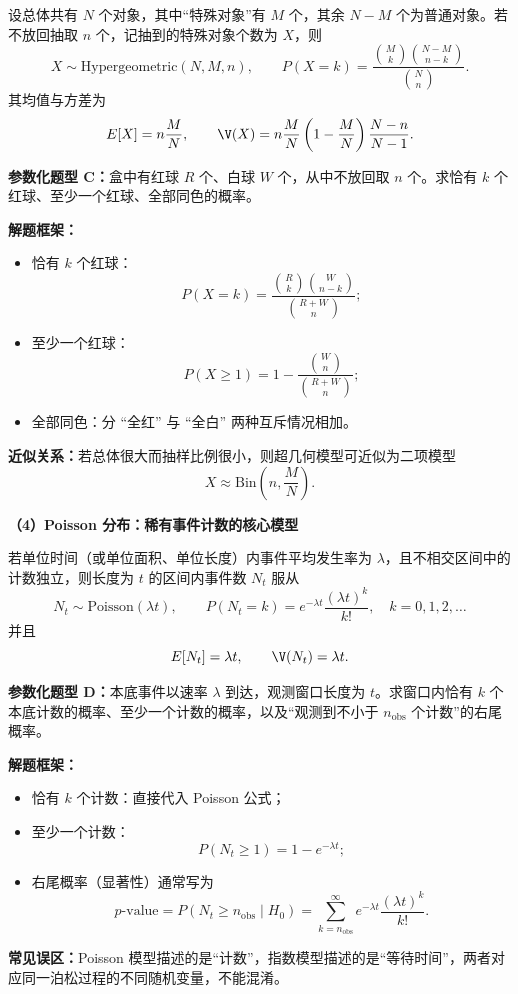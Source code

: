 设总体共有 $N$ 个对象，其中“特殊对象”有 $M$ 个，其余 $N-M$ 个为普通对象。若不放回抽取 $n$ 个，记抽到的特殊对象个数为 $X$，则
\[
X\sim \mathrm{Hypergeometric}(N,M,n),\qquad
P(X=k)=\frac{\binom{M}{k}\binom{N-M}{n-k}}{\binom{N}{n}}.
\]
其均值与方差为
\[
E[X]=n\frac{M}{N},\qquad
\V(X)=n\frac{M}{N}\left(1-\frac{M}{N}\right)\frac{N-n}{N-1}.
\]

\textbf{参数化题型 C：}盒中有红球 $R$ 个、白球 $W$ 个，从中不放回取 $n$ 个。求恰有 $k$ 个红球、至少一个红球、全部同色的概率。

\textbf{解题框架：}
\begin{itemize}[leftmargin=2em,itemsep=0.12em,topsep=0.12em]
  \item 恰有 $k$ 个红球：
  \[
  P(X=k)=\frac{\binom{R}{k}\binom{W}{n-k}}{\binom{R+W}{n}};
  \]
  \item 至少一个红球：
  \[
  P(X\ge 1)=1-\frac{\binom{W}{n}}{\binom{R+W}{n}};
  \]
  \item 全部同色：分 ``全红'' 与 ``全白'' 两种互斥情况相加。
\end{itemize}

\textbf{近似关系：}若总体很大而抽样比例很小，则超几何模型可近似为二项模型
\[
X\approx \mathrm{Bin}\left(n,\frac{M}{N}\right).
\]

\textbf{（4）Poisson 分布：稀有事件计数的核心模型}

若单位时间（或单位面积、单位长度）内事件平均发生率为 $\lambda$，且不相交区间中的计数独立，则长度为 $t$ 的区间内事件数 $N_t$ 服从
\[
N_t\sim \mathrm{Poisson}(\lambda t),\qquad
P(N_t=k)=e^{-\lambda t}\frac{(\lambda t)^k}{k!},\quad k=0,1,2,\dots
\]
并且
\[
E[N_t]=\lambda t,\qquad \V(N_t)=\lambda t.
\]

\textbf{参数化题型 D：}本底事件以速率 $\lambda$ 到达，观测窗口长度为 $t$。求窗口内恰有 $k$ 个本底计数的概率、至少一个计数的概率，以及“观测到不小于 $n_\mathrm{obs}$ 个计数”的右尾概率。

\textbf{解题框架：}
\begin{itemize}[leftmargin=2em,itemsep=0.12em,topsep=0.12em]
  \item 恰有 $k$ 个计数：直接代入 Poisson 公式；
  \item 至少一个计数：
  \[
  P(N_t\ge 1)=1-e^{-\lambda t};
  \]
  \item 右尾概率（显著性）通常写为
  \[
  p\text{-value}=P(N_t\ge n_{\mathrm{obs}}\mid H_0)=\sum_{k=n_{\mathrm{obs}}}^{\infty} e^{-\lambda t}\frac{(\lambda t)^k}{k!}.
  \]
\end{itemize}

\textbf{常见误区：}Poisson 模型描述的是“计数”，指数模型描述的是“等待时间”，两者对应同一泊松过程的不同随机变量，不能混淆。

